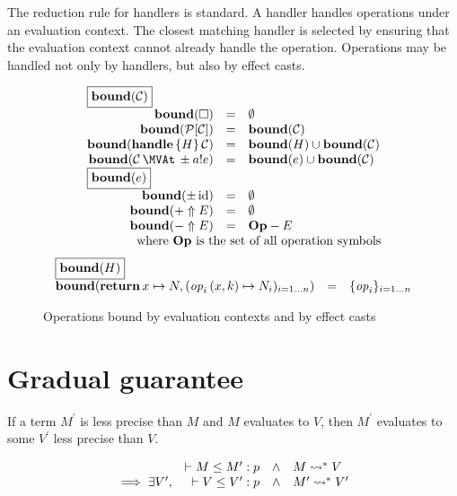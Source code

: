 The reduction rule for handlers is standard. A handler handles operations under an
evaluation context. The closest matching handler is selected by ensuring that
the evaluation context cannot already handle the operation.
Operations may be handled not only by handlers, but also by effect casts.



\begin{figure}
\[
\begin{array}{rcl}
\multicolumn{3}{l}{\fbox{$\bound{\xC}$}} \\
  \bound{\square} & = & \emptyset \\
  \bound{\context{\xP}{\xC}} & = & \bound{\xC} \\
  \bound{\handle{H}{\xC}} & = & \bound{H} \cup \bound{\xC} \\
  \bound{\cast{\xC}{\pm \cty{e}{a}}} & = & \bound{e} \cup \bound{\xC} \\
\multicolumn{3}{l}{\fbox{$\bound{e}$}} \\
  \bound{\pm\, \cid} & = & \emptyset \\
  \bound{+ \Uparrow E} & = & \emptyset \\
  \bound{- \Uparrow E} & = & \mathbf{Op} - E \\
  && \quad \makebox[0pt]{\text{where $\mathbf{Op}$ is the set of all operation symbols} }
\end{array}
\]
\[
\begin{array}{rcl}
\multicolumn{3}{l}{\fbox{$\bound{H}$}} \\
  \bound{\treturn{x}\mapsto N, \fori{i}{n}{\perform{\effop_i}{x,k} \mapsto N_i}}
    &=& \foriset{i}{n}{\effop_i}
\end{array}
\]
\caption{Operations bound by evaluation contexts and by effect casts}
\end{figure}

\section{Gradual guarantee}

If a term $M^\prime$ is less precise than $M$ and $M$ evaluates to $V$,
then $M^\prime$ evaluates to some $V^\prime$ less precise than $V$.

\newcommand\wwedge{\quad\wedge\quad}

\[
\begin{array}{rrcl}
  & \vdash M \le M^\prime : p & \wedge & M \rightsquigarrow^\ast V
\\ \implies \exists V^\prime , & \vdash V \le V^\prime : p & \wedge & M^\prime \rightsquigarrow^\ast V^\prime
\end{array}
\]

